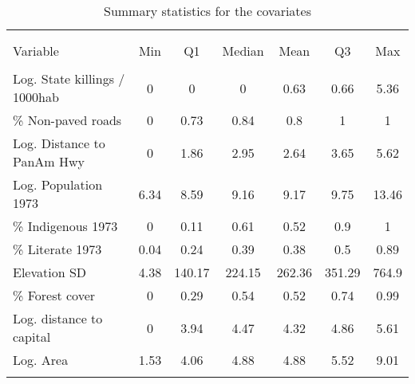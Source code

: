 \begin{table}[!htbp] \centering
\caption{Summary statistics for the covariates}
\label{tab:sumstats}
\small
\begin{tabular}{lcccccc}
\\[-1.8ex]\hline
\hline \\[-1.8ex]
\\[-1.8ex]
Variable & Min & Q1 & Median & Mean & Q3 & Max \\
\hline \\[-1.8ex]
Log. State killings / 1000hab & 0 & 0 & 0 & 0.63 & 0.66 & 5.36 \\
\% Non-paved roads & 0 & 0.73 & 0.84 & 0.8 & 1 & 1 \\
Log. Distance to PanAm Hwy & 0 & 1.86 & 2.95 & 2.64 & 3.65 & 5.62 \\
Log. Population 1973 & 6.34 & 8.59 & 9.16 & 9.17 & 9.75 & 13.46 \\
\% Indigenous 1973 & 0 & 0.11 & 0.61 & 0.52 & 0.9 & 1 \\
\% Literate 1973 & 0.04 & 0.24 & 0.39 & 0.38 & 0.5 & 0.89 \\
Elevation SD & 4.38 & 140.17 & 224.15 & 262.36 & 351.29 & 764.9 \\
\% Forest cover & 0 & 0.29 & 0.54 & 0.52 & 0.74 & 0.99 \\
Log. distance to capital & 0 & 3.94 & 4.47 & 4.32 & 4.86 & 5.61 \\
Log. Area & 1.53 & 4.06 & 4.88 & 4.88 & 5.52 & 9.01 \\
\hline
\hline \\[-1.8ex]
\end{tabular}
\end{table}

